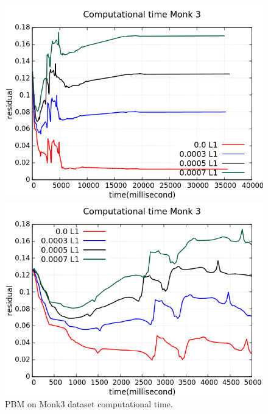 \begin{figure}[H]
	\centering
	\begin{minipage}[t]{0.5\linewidth}
		\includegraphics[width=\linewidth]{data/PBM/Monk3/Monk3_PBM_L1_CT_standard.png}
	\end{minipage}%
	\begin{minipage}[t]{0.5\linewidth}
		\includegraphics[width=\linewidth]{data/PBM/Monk3/Monk3_PBM_L1_CT_zoom.png}
	\end{minipage}
	\caption{PBM on Monk3 dataset computational time.}
\end{figure}
